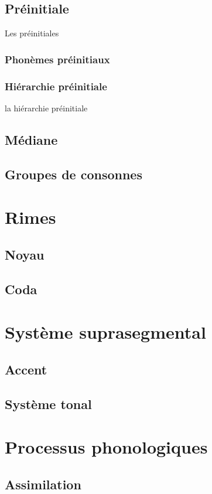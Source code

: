 \documentclass[11pt, a4paper]{book}              %
\begin{document}
\subsection{Préinitiale}

Les préinitiales

\subsubsection{Phonèmes préinitiaux}
\subsubsection{Hiérarchie préinitiale}

la hiérarchie préinitiale

\subsection{Médiane}
\subsection{Groupes de consonnes}
\section{Rimes}
\subsection{Noyau}
\subsection{Coda}
\section{Système suprasegmental}
\subsection{Accent}
\subsection{Système tonal}
\section{Processus phonologiques}
\subsection{Assimilation}
\end{document}

